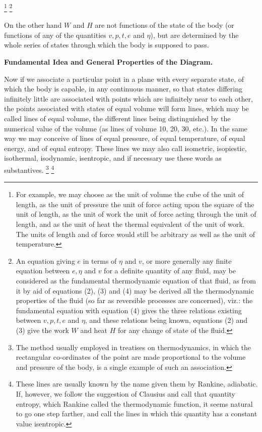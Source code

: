 \documentclass[11pt]{article}
\begin{document}
\footnote{For example, we may choose as the unit of volume the cube of the unit of length, as the unit of pressure the unit of force acting upon the square of the unit of length, as the unit of work the unit of force acting through the unit of length, and as the unit of heat the thermal equivalent of the unit of work. The units of length and of force would still be arbitrary as well as the unit of temperature.}
\footnote{An equation giving $e$ in terms of $\eta$ and $v$, or more generally any finite equation between $e,\eta$ and $v$ for a definite quantity of any fluid, may be considered as the fundamental thermodynamic equation of that fluid, as from it by aid of equations (2), (3) and (4) may be derived all the thermodynamic properties of the fluid (so far as reversible processes are concerned), viz.: the fundamental equation with equation (4) gives the three relations existing between $v,p,t,e$ and $\eta$, and these relations being known, equations (2) and (3) give the work $W$ and heat $H$ for any change of state of the fluid.}

On the other hand $W$ and $H$ are not functions of the state of the body (or functions of any of the quantities $v,p,t,e$ and $\eta$), but are determined by the whole series of states through which the body is supposed to pass.

\begin{center}
\bfseries Fundamental Idea and General Properties of the Diagram.
\end{center}

Now if we associate a particular point in a plane with every separate state, of which the body is capable, in any continuous manner, so that states differing infinitely little are associated with points which are infinitely near to each other, the points associated with states of equal volume will form lines, which may be called lines of equal volume, the different lines being distinguished by the numerical value of the volume (as lines of volume 10, 20, 30, etc.). In the same way we may conceive of lines of equal pressure, of equal temperature, of equal energy, and of equal entropy. These lines we may also call isometric, isopiestic, isothermal, isodynamic, isentropic, and if necessary use these words as substantives.
\footnote{The method usually employed in treatises on thermodynamics, in which the rectangular co-ordinates of the point are made proportional to the volume and pressure of the body, is a single example of such an association.}
\footnote{These lines are usually known by the name given them by Rankine, adiabatic. If, however, we follow the suggestion of Clausius and call that quantity entropy, which Rankine called the thermodynamic function, it seems natural to go one step farther, and call the lines in which this quantity has a constant value isentropic.}
\end{document}

